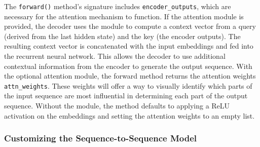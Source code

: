 The \lstinline{forward()} method’s signature includes \lstinline{encoder_outputs}, which are necessary for the attention mechanism to function. If the attention module is provided, the decoder uses the module to compute a context vector from a query (derived from the last hidden state) and the key (the encoder outputs).
The resulting context vector is concatenated with the input embeddings and fed into the recurrent neural network. This allows the decoder to use additional contextual information from the encoder to generate the output sequence.
With the optional attention module, the forward method returns the attention weights \lstinline{attn_weights}. These weights will offer a way to visually identify which parts of the input sequence are most influential in determining each part of the output sequence. Without the module, the method defaults to applying a ReLU activation on the embeddings and setting the attention weights to an empty list.

\subsubsection{Customizing the Sequence-to-Sequence Model}

